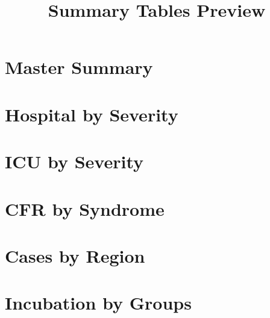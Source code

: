 \documentclass[11pt,a4paper]{article}
\begin{document}
\title{Summary Tables Preview}
\maketitle

\section{Master Summary}
\begin{table}[htbp]\centering\resizebox{\textwidth}{!}{}\end{table}

\section{Hospital by Severity}
\begin{table}[htbp]\centering\resizebox{\textwidth}{!}{}\end{table}

\section{ICU by Severity}
\begin{table}[htbp]\centering\resizebox{\textwidth}{!}{}\end{table}

\section{CFR by Syndrome}
\begin{table}[htbp]\centering\resizebox{\textwidth}{!}{}\end{table}

\section{Cases by Region}
\begin{table}[htbp]\centering\resizebox{\textwidth}{!}{}\end{table}

\section{Incubation by Groups}
\begin{table}[htbp]\centering\resizebox{\textwidth}{!}{}\end{table}
\end{document}
